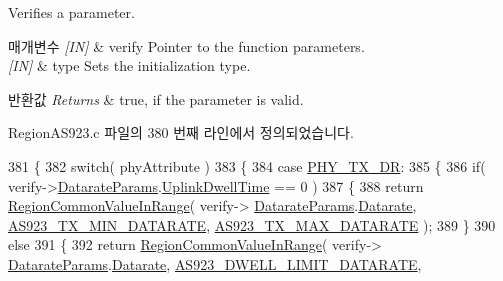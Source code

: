 Verifies a parameter. 


\begin{DoxyParams}{매개변수}
{\em \mbox{[}\+I\+N\mbox{]}} & verify Pointer to the function parameters.\\
\hline
{\em \mbox{[}\+I\+N\mbox{]}} & type Sets the initialization type.\\
\hline
\end{DoxyParams}

\begin{DoxyRetVals}{반환값}
{\em Returns} & true, if the parameter is valid. \\
\hline
\end{DoxyRetVals}


Region\+A\+S923.\+c 파일의 380 번째 라인에서 정의되었습니다.


\begin{DoxyCode}
381 \{
382     \textcolor{keywordflow}{switch}( phyAttribute )
383     \{
384         \textcolor{keywordflow}{case} \mbox{\hyperlink{group___r_e_g_i_o_n_gga51cbe8f5433d914fe9cf81b451de2c2da62c19af9dc2c54540562e1158c015f57}{PHY\_TX\_DR}}:
385         \{
386             \textcolor{keywordflow}{if}( verify->\mbox{\hyperlink{unionu_verify_params_a92427be16343eb3d9c14334eb95ec058}{DatarateParams}}.\mbox{\hyperlink{structu_verify_params_1_1s_datarate_params_a0e6663762d6f9173bc8d8cb018f8f17a}{UplinkDwellTime}} == 0 )
387             \{
388                 \textcolor{keywordflow}{return} \mbox{\hyperlink{group___r_e_g_i_o_n_c_o_m_m_o_n_gafdd1c80d953e18d755a631b72a9c3bd3}{RegionCommonValueInRange}}( verify->
      \mbox{\hyperlink{unionu_verify_params_a92427be16343eb3d9c14334eb95ec058}{DatarateParams}}.\mbox{\hyperlink{structu_verify_params_1_1s_datarate_params_ae2f6080f3aa0e9485c55513ca56bb24d}{Datarate}}, \mbox{\hyperlink{group___r_e_g_i_o_n_a_s923_gab6f2badbf9a4eb4038301759c0f7fc77}{AS923\_TX\_MIN\_DATARATE}}, 
      \mbox{\hyperlink{group___r_e_g_i_o_n_a_s923_gac9506097a516f03c7c86432d30e8f499}{AS923\_TX\_MAX\_DATARATE}} );
389             \}
390             \textcolor{keywordflow}{else}
391             \{
392                 \textcolor{keywordflow}{return} \mbox{\hyperlink{group___r_e_g_i_o_n_c_o_m_m_o_n_gafdd1c80d953e18d755a631b72a9c3bd3}{RegionCommonValueInRange}}( verify->
      \mbox{\hyperlink{unionu_verify_params_a92427be16343eb3d9c14334eb95ec058}{DatarateParams}}.\mbox{\hyperlink{structu_verify_params_1_1s_datarate_params_ae2f6080f3aa0e9485c55513ca56bb24d}{Datarate}}, \mbox{\hyperlink{group___r_e_g_i_o_n_a_s923_gab4d42ec6203089aa346cd55d90eb769e}{AS923\_DWELL\_LIMIT\_DATARATE}}, 

\end{DoxyCode}
